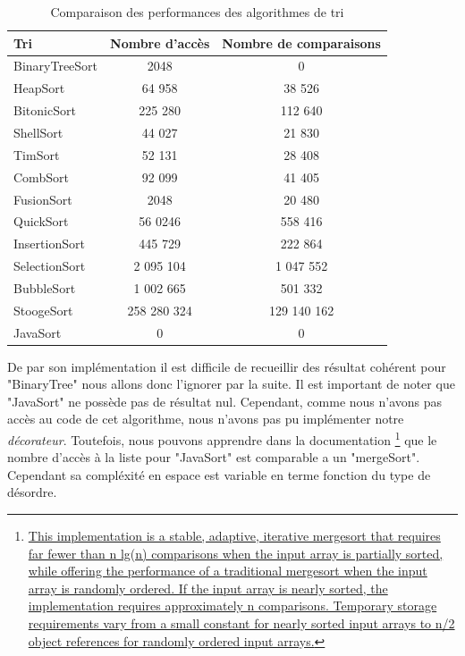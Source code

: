 \documentclass[a4paper,12pt]{article}
\begin{document}
    \begin{table}[htbp]
    \centering
    \begin{tabular}{|l|c|c|}
        \hline
        \textbf{Tri} & \textbf{Nombre d'accès} & \textbf{Nombre de comparaisons} \\
        \hline
        BinaryTreeSort & 2048 & 0 \\
        HeapSort & 64 958 & 38 526 \\
        BitonicSort & 225 280 & 112 640 \\
        ShellSort & 44 027 & 21 830 \\
        TimSort & 52 131 & 28 408 \\
        CombSort & 92 099 & 41 405 \\
        FusionSort & 2048 & 20 480\\
        QuickSort & 56 0246 & 558 416 \\
        InsertionSort & 445 729 & 222 864 \\
        SelectionSort & 2 095 104 & 1 047 552 \\
        BubbleSort & 1 002 665 & 501 332 \\
        StoogeSort & 258 280 324 & 129 140 162 \\
        JavaSort & 0 & 0 \\
        \hline
    \end{tabular}
    \caption{Comparaison des performances des algorithmes de tri}
    \label{tab:sorting_comparison}
    \end{table}
    
    De par son implémentation il est difficile de recueillir des résultat cohérent pour "BinaryTree" nous allons donc l'ignorer par la suite. Il est important de noter que "JavaSort" ne possède pas de résultat nul. Cependant, comme nous n'avons pas accès au code de cet algorithme, nous n'avons pas pu implémenter notre \textit{décorateur}. Toutefois, nous pouvons apprendre dans la documentation
    \footnote{\href{https://docs.oracle.com/javase/8/docs/api/java/util/List.html}{This implementation is a stable, adaptive, iterative mergesort that requires far fewer than n lg(n) comparisons when the input array is partially sorted, while offering the performance of a traditional mergesort when the input array is randomly ordered. If the input array is nearly sorted, the implementation requires approximately n comparisons. Temporary storage requirements vary from a small constant for nearly sorted input arrays to n/2 object references for randomly ordered input arrays.}}
    que le nombre d'accès à la liste pour "JavaSort" est comparable a un "mergeSort". Cependant sa compléxité en espace est variable en terme fonction du type de désordre. 
    
\end{document}
